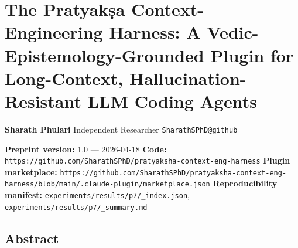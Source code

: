 \section{The Pratyakṣa Context-Engineering Harness: A Vedic-Epistemology-Grounded Plugin for Long-Context, Hallucination-Resistant LLM Coding Agents}\label{the-pratyakux1e63a-context-engineering-harness-a-vedic-epistemology-grounded-plugin-for-long-context-hallucination-resistant-llm-coding-agents}

\textbf{Sharath Phulari}
Independent Researcher
\texttt{SharathSPhD@github}

\textbf{Preprint version:} 1.0 --- 2026-04-18
\textbf{Code:} \texttt{https://github.com/SharathSPhD/pratyaksha-context-eng-harness}
\textbf{Plugin marketplace:} \texttt{https://github.com/SharathSPhD/pratyaksha-context-eng-harness/blob/main/.claude-plugin/marketplace.json}
\textbf{Reproducibility manifest:} \texttt{experiments/results/p7/\_index.json}, \texttt{experiments/results/p7/\_summary.md}

\subsection{Abstract}\label{abstract}

